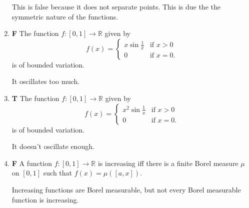 \documentclass[11pt,oneside,english]{amsart}
\theoremstyle{definition}
\newcommand{\MB}[1]{\mathbb{#1}}
\begin{document}
\begin{enumerate}
This is false because it does not separate points. This is due the the symmetric nature of the functions.

\item \textbf{F}
The function $f: [0,1] \to \MB{R}$ given by 
\[
f(x)=\begin{cases}x\sin\frac{1}{x} & \text{if }x>0\\0 & \text{if }x=0.\end{cases}
\]
is of bounded variation.

It oscillates too much.

\item \textbf{T}
The function $f: [0,1] \to \MB{R}$ given by 
\[
f(x)=\begin{cases}x^2\sin\frac{1}{x} & \text{if }x>0\\0 & \text{if }x=0.\end{cases}
\]
is of bounded variation.

It doesn't oscillate enough.


\item \textbf{F}
A function $f : [0,1] \to \MB{R}$ is increasing iff there is a finite Borel measure $\mu$ on $[0,1]$ such that $f(x) = \mu([a,x])$. 

Increasing functions are Borel measurable, but not every Borel measurable function is increasing.

\end{enumerate}
\end{document}
